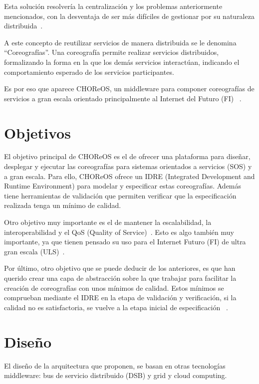 \documentclass[runningheads]{llncs}
\begin{document}
Esta solución resolvería la centralización y los problemas anteriormente mencionados, con la desventaja de ser más difíciles de gestionar por su naturaleza distribuida~\cite{a_1}.

A este concepto de reutilizar servicios de manera distribuida se le denomina ``Coreografías''. Una coreografía permite realizar servicios distribuidos, formalizando la forma en la que los demás servicios interactúan, indicando el comportamiento esperado de los servicios participantes.

Es por eso que aparece CHOReOS, un middleware para componer coreografías de servicios a gran escala orientado principalmente al Internet del Futuro (FI) ~\cite{a_1}.

\section{Objetivos}
El objetivo principal de CHOReOS es el de ofrecer una plataforma para diseñar, desplegar y ejecutar las coreografías para sistemas orientados a servicios (SOS) y a gran escala. Para ello, CHOReOS ofrece un IDRE (Integrated Development and Runtime Environment) para modelar y especificar estas coreografías. Además tiene herramientas de validación que permiten verificar que la especificación realizada tenga un mínimo de calidad. ~\cite{a_2}

Otro objetivo muy importante es el de mantener la escalabilidad, la interoperabilidad y el QoS (Quality of Service)~\cite{a_3}. Esto es algo también muy importante, ya que tienen pensado su uso para el Internet Futuro (FI) de ultra gran escala (ULS)~\cite{a_2}.

Por último, otro objetivo que se puede deducir de los anteriores, es que han querido crear una capa de abstracción sobre la que trabajar para facilitar la creación de coreografías con unos mínimos de calidad. Estos mínimos se comprueban mediante el IDRE en la etapa de validación y verificación, si la calidad no es satisfactoria, se vuelve a la etapa inicial de especificación ~\cite{a_2}.

\section{Diseño}
El diseño de la arquitectura que proponen, se basan en otras tecnologías middleware: bus de servicio distribuido (DSB) y grid y cloud computing.~\cite{a_1}
\end{document}
